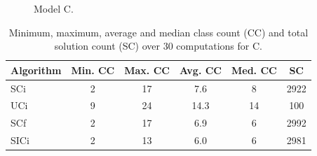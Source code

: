 \documentclass[a4paper, 12pt]{scrartcl}
\begin{document}
\begin{figure}
\centering
{}%
\hfill
{}%
\caption{Model C.}
\end{figure}

\begin{table}%
\centering
\begin{tabular}{lccccc}
Algorithm & Min. CC & Max. CC & Avg. CC & Med. CC & SC\\
\hline
SCi & 2 & 17 & 7.6 & 8 & 2922\\
UCi & 9 & 24 & 14.3 & 14 & 100\\
SCf & 2 & 17 & 6.9 & 6 & 2992\\
SICi & 2 & 13 & 6.0 & 6 & 2981
\end{tabular}
\caption{Minimum, maximum, average and median class count (CC) and total solution count (SC) over 30 computations for C.}
\label{}
\end{table}

\clearpage
\end{document}
